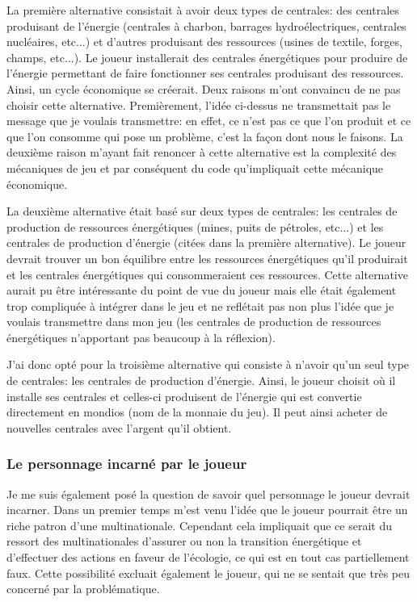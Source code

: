 \documentclass{article}
\begin{document}
        
        La première alternative consistait à avoir deux types de centrales: des centrales produisant de l'énergie (centrales à charbon, barrages hydroélectriques, centrales nucléaires, etc...) et d'autres produisant des ressources (usines de textile, forges, champs, etc...). Le joueur installerait des centrales énergétiques pour produire de l'énergie permettant de faire fonctionner ses centrales produisant des ressources. Ainsi, un cycle économique se créerait. 
        Deux raisons m'ont convaincu de ne pas choisir cette alternative. Premièrement, l'idée ci-dessus ne transmettait pas le message que je voulais transmettre: en effet, ce n'est pas ce que l'on produit et ce que l'on consomme qui pose un problème, c'est la façon dont nous le faisons. La deuxième raison m'ayant fait renoncer à cette alternative est la complexité des mécaniques de jeu et par conséquent du code qu'impliquait cette mécanique économique.
        
        
        La deuxième alternative était basé sur deux types de centrales: les centrales de production de ressources énergétiques (mines, puits de pétroles, etc...) et les centrales de production d'énergie (citées dans la première alternative). Le joueur devrait trouver un bon équilibre entre les ressources énergétiques qu'il produirait et les centrales énergétiques qui consommeraient ces ressources.
        Cette alternative aurait pu être intéressante du point de vue du joueur mais elle était également trop compliquée à intégrer dans le jeu et ne reflétait pas non plus l'idée que je voulais transmettre dans mon jeu (les centrales de production de ressources énergétiques n'apportant pas beaucoup à la réflexion).
        
        
        J'ai donc opté pour la troisième alternative qui consiste à n'avoir qu'un seul type de centrales: les centrales de production d'énergie. Ainsi, le joueur choisit où il installe ses centrales et celles-ci produisent de l'énergie qui est convertie directement en mondios (nom de la monnaie du jeu). Il peut ainsi acheter de nouvelles centrales avec l'argent qu'il obtient.
        
        \subsubsection{Le personnage incarné par le joueur}
        Je me suis également posé la question de savoir quel personnage le joueur devrait incarner. Dans un premier temps m'est venu l'idée que le joueur pourrait être un riche patron d'une multinationale. Cependant cela impliquait que ce serait du ressort des multinationales d'assurer ou non la transition énergétique et d'effectuer des actions en faveur de l'écologie, ce qui est en tout cas partiellement faux. Cette possibilité excluait également le joueur, qui ne se sentait que très peu concerné par la problématique.
        
\end{document}

